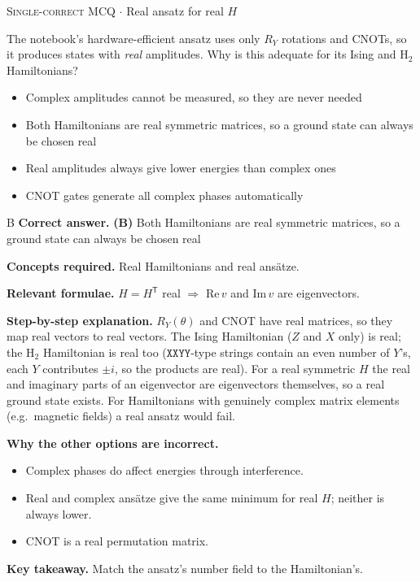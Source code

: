 \documentclass[11pt,a4paper]{article}
\newcommand{\optlabel}[1]{\textbf{(#1)}}
\newcommand{\correctlabel}[1]{\textcolor{okgreen}{\textbf{(#1)}\,\ding{51}}}
\newenvironment{qitem}[1]{\begin{list}{}{\setlength{\leftmargin}{3.3em}\setlength{\labelwidth}{3.1em}%
  \setlength{\labelsep}{0.2em}\setlength{\topsep}{3pt}\setlength{\parsep}{3pt}}\item[\textbf{Q.#1}\hfill]}{\end{list}}
\newcommand{\qsep}{\par\vspace{2pt}{\color{black!15}\hrule}\vspace{4pt}}
\newcommand{\qmeta}[2]{{\footnotesize\color{black!60}\textsc{#1} \;$\cdot$\; #2}\par}
\begin{document}
\begin{qitem}{56}
\qmeta{Single-correct MCQ}{Real ansatz for real $H$}
The notebook's hardware-efficient ansatz uses only $R_Y$ rotations and CNOTs, so it produces states with \emph{real} amplitudes. Why is this
adequate for its Ising and H$_2$ Hamiltonians?
\begin{itemize}[leftmargin=2.6em, labelsep=0.4em, itemsep=2pt, topsep=3pt]
\item[\optlabel{A}] Complex amplitudes cannot be measured, so they are never needed
\item[\correctlabel{B}] Both Hamiltonians are real symmetric matrices, so a ground state can always be chosen real
\item[\optlabel{C}] Real amplitudes always give lower energies than complex ones
\item[\optlabel{D}] CNOT gates generate all complex phases automatically
\end{itemize}
\end{qitem}
\begin{solbox}{B}
\textbf{\color{brand}Correct answer.} \textcolor{okgreen}{\textbf{(B)}} Both Hamiltonians are real symmetric matrices, so a ground state can always be chosen real

\textbf{\color{brand}Concepts required.} Real Hamiltonians and real ansätze.

\textbf{\color{brand}Relevant formulae.} $H = H^{\mathsf T}$ real $\Rightarrow$ $\mathrm{Re}\,v$ and $\mathrm{Im}\,v$ are eigenvectors.

\textbf{\color{brand}Step-by-step explanation.} $R_Y(\theta)$ and CNOT have real matrices, so they map real vectors to real vectors. The Ising Hamiltonian ($Z$ and $X$ only) is real; the H$_2$
Hamiltonian is real too ($\texttt{XXYY}$-type strings contain an even number of $Y$'s, each $Y$ contributes $\pm i$, so the products are real).
For a real symmetric $H$ the real and imaginary parts of an eigenvector are eigenvectors themselves, so a real ground state exists. For
Hamiltonians with genuinely complex matrix elements (e.g.\ magnetic fields) a real ansatz would fail.

\textbf{\color{brand}Why the other options are incorrect.}
\begin{itemize}[leftmargin=2.4em, itemsep=1pt, topsep=2pt]
\item[\textbf{(A)}] Complex phases do affect energies through interference.
\item[\textbf{(C)}] Real and complex ansätze give the same minimum for real $H$; neither is always lower.
\item[\textbf{(D)}] CNOT is a real permutation matrix.
\end{itemize}
\textbf{\color{brand}Key takeaway.} Match the ansatz's number field to the Hamiltonian's.
\end{solbox}
\qsep
\end{document}
